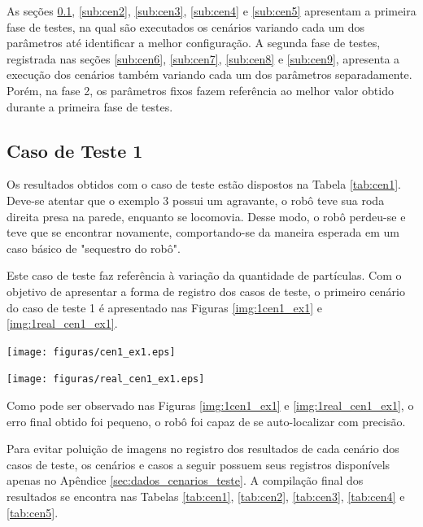 As seções \ref{sub:cen1}, \ref{sub:cen2}, \ref{sub:cen3}, \ref{sub:cen4} e \ref{sub:cen5} apresentam a primeira fase de testes, na qual são executados
os cenários variando cada um dos parâmetros até identificar a melhor configuração. A segunda fase de testes, registrada nas seções
\ref{sub:cen6}, \ref{sub:cen7}, \ref{sub:cen8} e \ref{sub:cen9}, apresenta a execução dos cenários também variando cada um dos parâmetros
separadamente. Porém, na fase 2, os parâmetros fixos fazem referência ao melhor valor obtido durante a primeira fase de testes.

\subsection{Caso de Teste 1}
\label{sub:cen1}

Os resultados obtidos com o caso de teste estão dispostos na Tabela \ref{tab:cen1}. Deve-se atentar que o exemplo 3 possui um agravante, o
robô teve sua roda direita presa na parede, enquanto se locomovia. Desse modo, o robô perdeu-se e teve que se encontrar novamente, comportando-se
da maneira esperada em um caso básico de "sequestro do robô".

Este caso de teste faz referência à variação da quantidade de partículas. Com o objetivo de apresentar a forma de registro dos casos de teste,
o primeiro cenário do caso de teste 1 é apresentado nas Figuras \ref{img:1cen1_ex1} e \ref{img:1real_cen1_ex1}.

{\centering
\texttt{[image: figuras/cen1\_ex1.eps]}
\label{img:1cen1_ex1}
\par}

{\centering
\texttt{[image: figuras/real\_cen1\_ex1.eps]}
\label{img:1real_cen1_ex1}
\par}

Como pode ser observado nas Figuras \ref{img:1cen1_ex1} e \ref{img:1real_cen1_ex1}, o erro final obtido foi pequeno, o robô foi capaz
de se auto-localizar com precisão.

Para evitar poluição de imagens no registro dos resultados de cada cenário dos casos de teste, os cenários e casos a seguir
possuem seus registros disponívels apenas no Apêndice \ref{sec:dados_cenarios_teste}. A compilação final dos resultados se encontra nas Tabelas
\ref{tab:cen1}, \ref{tab:cen2}, \ref{tab:cen3}, \ref{tab:cen4} e \ref{tab:cen5}.


